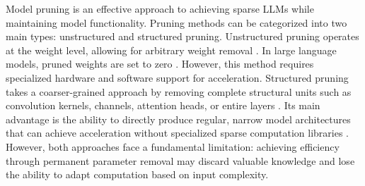 Model pruning is an effective approach to achieving sparse LLMs while maintaining model functionality. Pruning methods can be categorized into two main types: unstructured and structured pruning. Unstructured pruning operates at the weight level, allowing for arbitrary weight removal \cite{lee2018snip}. In large language models, pruned weights are set to zero \cite{frantar2023sparsegpt,sun2023simple}. However, this method requires specialized hardware and software support for acceleration\cite{han2015deep,wen2016learning,filters2016pruning,tang2021manifold}. Structured pruning takes a coarser-grained approach by removing complete structural units such as convolution kernels, channels, attention heads, or entire layers \cite{you2019gate,ashkboos2024slicegpt,liu2021group,ma2023llm,men2403shortgpt}. Its main advantage is the ability to directly produce regular, narrow model architectures that can achieve acceleration without specialized sparse computation libraries \cite{luo2017thinet,liu2021group,filters2016pruning,nonnenmacher2021sosp}. However, both approaches face a fundamental limitation: achieving efficiency through permanent parameter removal may discard valuable knowledge and lose the ability to adapt computation based on input complexity.


